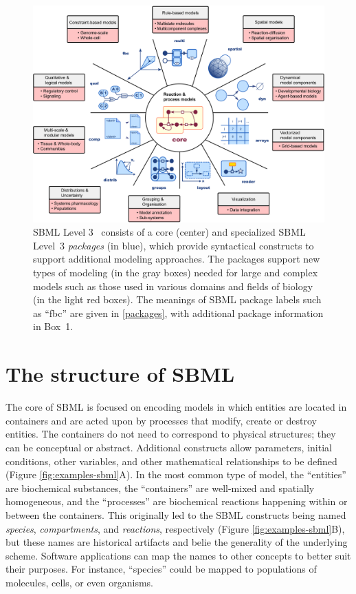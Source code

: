 \documentclass{sbml-paper}
\begin{document}
\begin{figure}[b]
  \center
  \includegraphics[width=\textwidth]{resources/SBML-Level3-v12.pdf}
\caption{SBML Level 3~\citep{Hucka2019systems} consists of a core (center) and specialized SBML Level~3 \emph{packages} (in blue), which provide syntactical constructs to support additional modeling approaches. The packages support new types of modeling (in the gray boxes) needed for large and complex models such as those used in various domains and fields of biology (in the light red boxes). The meanings of SBML package labels such as ``fbc'' are given in \autoref{packages}, with additional package information in Box~1.}
\label{level-3-diagram}
\end{figure}

\clearpage
\newpage

\section*{The structure of SBML}
\label{sec:sbml}

The core of SBML is focused on encoding models in which entities are located in containers and are acted upon by processes that modify, create or destroy entities.  The containers do not need to correspond to physical structures; they can be conceptual or abstract.  Additional constructs allow parameters, initial conditions, other variables, and other mathematical relationships to be defined (Figure \ref{fig:examples-sbml}A).  In the most common type of model, the ``entities'' are biochemical substances, the ``containers'' are well-mixed and spatially homogeneous, and the ``processes'' are biochemical reactions happening within or between the containers.  This originally led to the SBML constructs being named \emph{species}, \emph{compartments}, and \emph{reactions}, respectively (Figure \ref{fig:examples-sbml}B), but these names are historical artifacts and belie the generality of the underlying scheme.  Software applications can map the names to other concepts to better suit their purposes.  For instance, ``species'' could be mapped to populations of molecules, cells, or even organisms.
\end{document}
